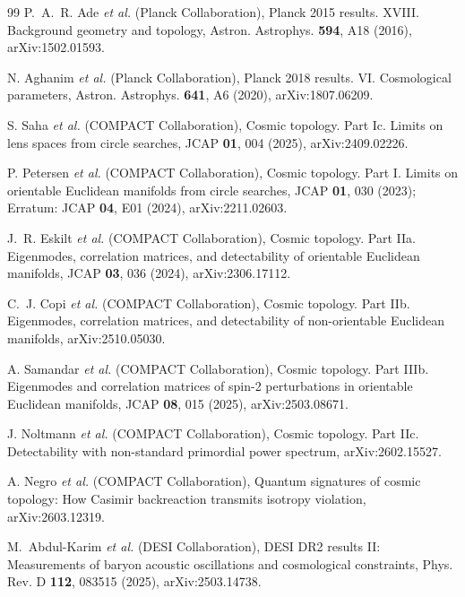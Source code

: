\documentclass[
  aps,
  prd,
  reprint,
  superscriptaddress,
  floatfix,
  nofootinbib,
  longbibliography
]{revtex4-2}
\theoremstyle{plain}
\theoremstyle{definition}
\theoremstyle{remark}
\begin{document}
\begin{thebibliography}{99}
P.~A.~R. Ade \emph{et al.} (Planck Collaboration),
Planck 2015 results. XVIII. Background geometry and topology,
Astron. Astrophys. \textbf{594}, A18 (2016), arXiv:1502.01593.

N. Aghanim \emph{et al.} (Planck Collaboration),
Planck 2018 results. VI. Cosmological parameters,
Astron. Astrophys. \textbf{641}, A6 (2020), arXiv:1807.06209.

S. Saha \emph{et al.} (COMPACT Collaboration),
Cosmic topology. Part Ic. Limits on lens spaces from circle searches,
JCAP \textbf{01}, 004 (2025), arXiv:2409.02226.


P. Petersen \emph{et al.} (COMPACT Collaboration),
Cosmic topology. Part I. Limits on orientable Euclidean manifolds from circle searches,
JCAP \textbf{01}, 030 (2023); Erratum: JCAP \textbf{04}, E01 (2024),
arXiv:2211.02603.

J.~R. Eskilt \emph{et al.} (COMPACT Collaboration),
Cosmic topology. Part IIa. Eigenmodes, correlation matrices, and detectability of orientable Euclidean manifolds,
JCAP \textbf{03}, 036 (2024), arXiv:2306.17112.

C.~J. Copi \emph{et al.} (COMPACT Collaboration),
Cosmic topology. Part IIb. Eigenmodes, correlation matrices, and detectability of non-orientable Euclidean manifolds,
arXiv:2510.05030.

A. Samandar \emph{et al.} (COMPACT Collaboration),
Cosmic topology. Part IIIb. Eigenmodes and correlation matrices of spin-2 perturbations in orientable Euclidean manifolds,
JCAP \textbf{08}, 015 (2025), arXiv:2503.08671.

J. Noltmann \emph{et al.} (COMPACT Collaboration),
Cosmic topology. Part IIc. Detectability with non-standard primordial power spectrum,
arXiv:2602.15527.

A. Negro \emph{et al.} (COMPACT Collaboration),
Quantum signatures of cosmic topology: How Casimir backreaction transmits isotropy violation,
arXiv:2603.12319.

M.~Abdul-Karim \emph{et al.} (DESI Collaboration),
DESI DR2 results II: Measurements of baryon acoustic oscillations and cosmological constraints,
Phys. Rev. D \textbf{112}, 083515 (2025), arXiv:2503.14738.

\end{thebibliography}
\end{document}
